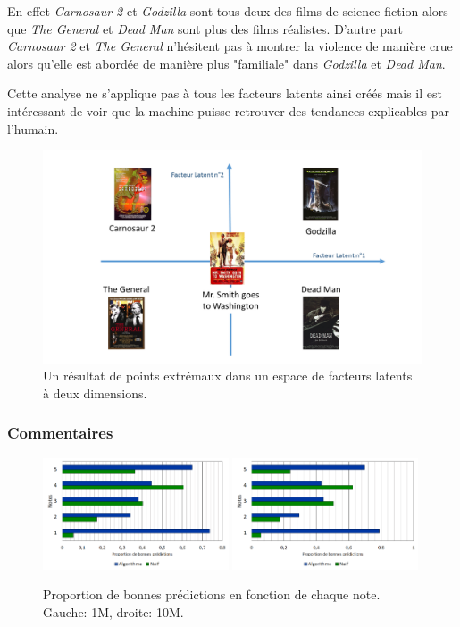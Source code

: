\documentclass[10pt,a4paper]{article}
\begin{document}
En effet \textit{Carnosaur 2} et \textit{Godzilla} sont tous deux des films de science fiction alors que \textit{The General} et \textit{Dead Man} sont plus des films réalistes. D'autre part \textit{Carnosaur 2} et \textit{The General} n'hésitent pas à montrer la violence de manière crue alors qu'elle est abordée de manière plus "familiale" dans \textit{Godzilla} et \textit{Dead Man}.

Cette analyse ne s'applique pas à tous les facteurs latents ainsi créés mais il est intéressant de voir que la machine puisse retrouver des tendances explicables par l'humain.

\begin{figure}[ht!]
\begin{center}
\includegraphics[width=0.9\linewidth]{fig/fac_lat.png}
\caption{\label{fac_lat} Un résultat de points extrémaux dans un espace de facteurs latents à deux dimensions. }
\end{center}
\end{figure}


\subsubsection*{Commentaires}

\begin{figure}[h]
\begin{center}
\includegraphics[width=0.49\textwidth]{fig/prop}
\includegraphics[width=0.49\textwidth]{fig/prop10m}
\caption{\label{graph_best} Proportion de bonnes prédictions en fonction de chaque note. Gauche: 1M, droite: 10M.}
\end{center}
\end{figure}
\end{document}
